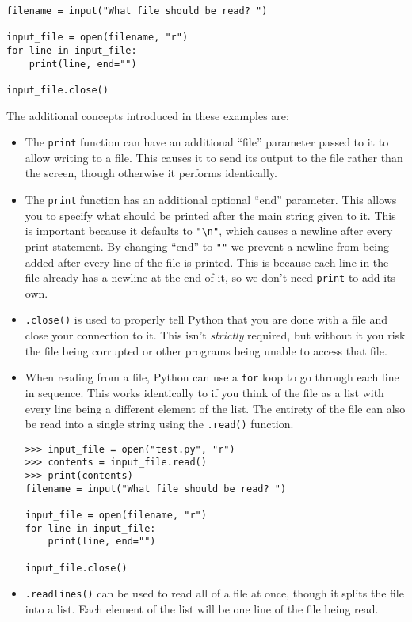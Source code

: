 \documentclass[11pt]{cselabheader}
\begin{document}
\begin{lstlisting}[style=python]
filename = input("What file should be read? ")

input_file = open(filename, "r")
for line in input_file:
    print(line, end="")

input_file.close()
\end{lstlisting}

The additional concepts introduced in these examples are:

\begin{itemize}
\item The \lstinline{print} function can have an additional ``file'' parameter passed to it to allow writing to a file. This causes it to send its output to the file rather than the screen, though otherwise it performs identically.

\item The \lstinline{print} function has an additional optional ``end'' parameter. This allows you to specify what should be printed after the main string given to it. This is important because it defaults to \lstinline{"\n"}, which causes a newline after every print statement. By changing ``end'' to \lstinline{""} we prevent a newline from being added after every line of the file is printed. This is because each line in the file already has a newline at the end of it, so we don't need \lstinline{print} to add its own.

\item \lstinline{.close()} is used to properly tell Python that you are done with a file and close your connection to it. This isn't \emph{strictly} required, but without it you risk the file being corrupted or other programs being unable to access that file.

\item When reading from a file, Python can use a \lstinline{for} loop to go through each line in sequence. This works identically to if you think of the file as a list with every line being a different element of the list. The entirety of the file can also be read into a single string using the \lstinline{.read()} function.

  \begin{lstlisting}[style=ipython]
>>> input_file = open("test.py", "r")
>>> contents = input_file.read()
>>> print(contents)
filename = input("What file should be read? ")

input_file = open(filename, "r")
for line in input_file:
    print(line, end="")

input_file.close()
  \end{lstlisting}

\item \lstinline{.readlines()} can be used to read all of a file at once, though it splits the file into a list. Each element of the list will be one line of the file being read.
\end{itemize}
\end{document}
